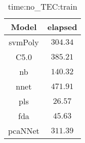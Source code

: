 \begin{table}[!ht]
	\centering
	\begin{tabular}{|c|c|}
		\hline
		Model & elapsed \\ \hline
		svmPoly & $304.34$ \\ \hline
		C5.0 & $385.21$ \\ \hline
		nb & $140.32$ \\ \hline
		nnet & $471.91$ \\ \hline
		pls & $26.57$ \\ \hline
		fda & $45.63$ \\ \hline
		pcaNNet & $311.39$ \\ \hline
	\end{tabular}
	\caption{time:no_TEC:train}
	\label{tab:time:no_TEC:train}
\end{table}
